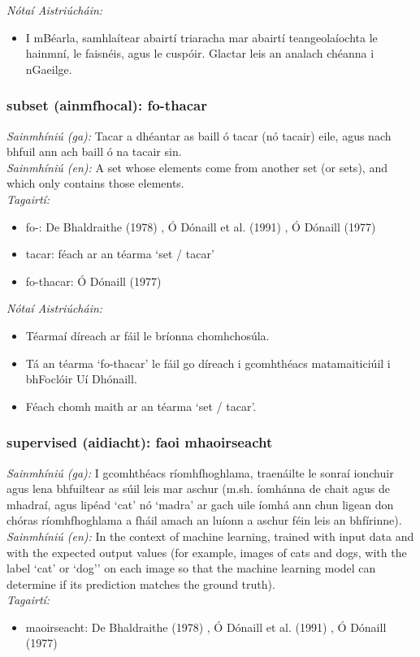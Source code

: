  \noindent \textit{Nótaí Aistriúcháin:}
\begin{itemize}
	\item I mBéarla, samhlaítear abairtí triaracha mar abairtí teangeolaíochta le hainmní, le faisnéis, agus le cuspóir. Glactar leis an analach chéanna i nGaeilge.
\end{itemize}


\subsubsection*{subset (ainmfhocal): fo-thacar}
 \noindent \textit{Sainmhíniú (ga):} Tacar a dhéantar as baill ó tacar (nó tacair) eile, agus nach bhfuil ann ach baill ó na tacair sin.
\\
 \noindent \textit{Sainmhíniú (en):} A set whose elements come from another set (or sets), and which only contains those elements.
\\
 \noindent \textit{Tagairtí:}
\begin{itemize}
	\item fo-: De Bhaldraithe (1978) \cite{de-bhaldraithe}, Ó Dónaill et al. (1991) \cite{focloir-beag}, Ó Dónaill (1977) \cite{odonaill}
	\item tacar: féach ar an téarma `set / tacar'
	\item fo-thacar: Ó Dónaill (1977) \cite{odonaill}
\end{itemize}

 \noindent \textit{Nótaí Aistriúcháin:}
\begin{itemize}
	\item Téarmaí díreach ar fáil le bríonna chomhchosúla.
	\item Tá an téarma `fo-thacar' le fáil go díreach i gcomhthéacs matamaiticiúil i bhFoclóir Uí Dhónaill.
	\item Féach chomh maith ar an téarma `set / tacar'.
\end{itemize}


\subsubsection*{supervised (aidiacht): faoi mhaoirseacht}
 \noindent \textit{Sainmhíniú (ga):} I gcomhthéacs ríomhfhoghlama, traenáilte le sonraí ionchuir agus lena bhfuiltear as súil leis mar aschur (m.sh. íomhánna de chait agus de mhadraí, agus lipéad `cat' nó `madra' ar gach uile íomhá ann chun ligean don chóras ríomhfhoghlama a fháil amach an luíonn a aschur féin leis an bhfírinne).
\\
 \noindent \textit{Sainmhíniú (en):} In the context of machine learning, trained with input data and with the expected output values (for example, images of cats and dogs, with the label `cat' or `dog'' on each image so that the machine learning model can determine if its prediction matches the ground truth).
\\
 \noindent \textit{Tagairtí:}
\begin{itemize}
	\item maoirseacht: De Bhaldraithe (1978) \cite{de-bhaldraithe}, Ó Dónaill et al. (1991) \cite{focloir-beag}, Ó Dónaill (1977) \cite{odonaill}
\end{itemize}

